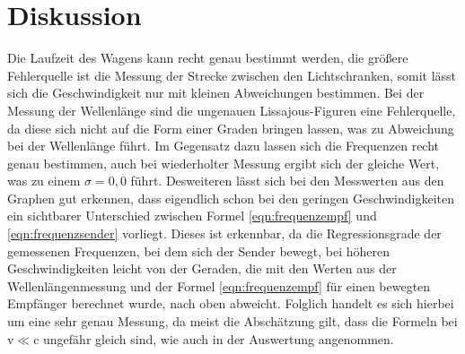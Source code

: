 \newpage
\section{Diskussion}
\label{sec:Diskussion}
Die Laufzeit des Wagens kann recht genau bestimmt werden, die größere Fehlerquelle
ist die Messung der Strecke zwischen den Lichtschranken, somit lässt sich die Geschwindigkeit
nur mit kleinen Abweichungen bestimmen.
Bei der Messung der Wellenlänge sind die ungenauen Lissajous-Figuren eine Fehlerquelle,
da diese sich nicht auf die Form einer Graden bringen lassen, was zu Abweichung bei der Wellenlänge
führt. Im Gegensatz dazu lassen sich die Frequenzen recht genau bestimmen, auch bei wiederholter
Messung ergibt sich der gleiche Wert, was zu einem $\sigma=0,0$ führt.
Desweiteren lässt sich bei den Messwerten aus den Graphen gut erkennen, dass eigendlich schon bei den geringen
Geschwindigkeiten ein sichtbarer Unterschied zwischen Formel \ref{eqn:frequenzempf} und \ref{eqn:frequenzsender} vorliegt.
Dieses ist erkennbar, da die Regressionsgrade der gemessenen Frequenzen, bei dem sich der Sender bewegt,
bei höheren Geschwindigkeiten leicht von der Geraden, die mit den Werten
aus der Wellenlängenmessung und der Formel \ref{eqn:frequenzempf} für einen bewegten Empfänger berechnet wurde, nach oben abweicht.
Folglich handelt es sich hierbei um eine sehr genau Messung, da meist die Abschätzung gilt, dass die Formeln bei v$\ll$c ungefähr gleich
sind, wie auch in der Auswertung angenommen.
